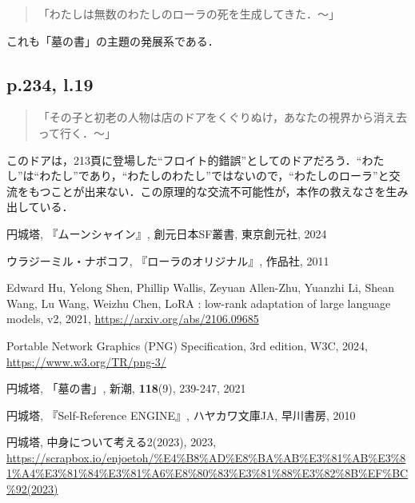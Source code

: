 \documentclass[10pt, a5paper, twoside]{jsarticle}
\theoremstyle{definition}
\begin{document}
			\begin{quote}

				「わたしは無数のわたしのローラの死を生成してきた．〜」
				
			\end{quote}

			これも「墓の書」の主題の発展系である．

		\subsection{p.234, l.19}

			\begin{quote}

				「その子と初老の人物は店のドアをくぐりぬけ，あなたの視界から消え去って行く．〜」
				
			\end{quote}

			このドアは，213頁に登場した“フロイト的錯誤”としてのドアだろう．“わたし”は“わたし”であり，“わたしのわたし”ではないので，“わたしのローラ”と交流をもつことが出来ない．この原理的な交流不可能性が，本作の救えなさを生み出している．

	\begin{thebibliography}{99}

		 円城塔, 『ムーンシャイン』, 創元日本SF叢書, 東京創元社, 2024

		 ウラジーミル・ナボコフ, 『ローラのオリジナル』, 作品社, 2011

		 Edward Hu, Yelong Shen, Phillip Wallis, Zeyuan Allen-Zhu, Yuanzhi Li, Shean Wang, Lu Wang, Weizhu Chen, LoRA : low-rank adaptation of large language models, v2, 2021, \url{https://arxiv.org/abs/2106.09685}

		 Portable Network Graphics (PNG) Specification, 3rd edition, W3C, 2024, \url{https://www.w3.org/TR/png-3/}

		 円城塔, 「墓の書」, 新潮, \textbf{118}(9), 239-247, 2021

		 円城塔, 『Self-Reference ENGINE』, ハヤカワ文庫JA, 早川書房, 2010

		 円城塔, 中身について考える2(2023), 2023, \url{https://scrapbox.io/enjoetoh/%E4%B8%AD%E8%BA%AB%E3%81%AB%E3%81%A4%E3%81%84%E3%81%A6%E8%80%83%E3%81%88%E3%82%8B%EF%BC%92(2023)}

	\end{thebibliography}
\end{document}
